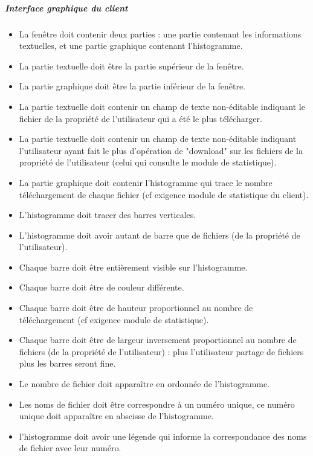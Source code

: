 \documentclass[10pt,a4paper]{report}
\begin{document}
	\subparagraph{Interface graphique du client}
		\begin{itemize}[label = $\triangleright$]

			\item La fenêtre doit contenir deux parties : une partie contenant les informations textuelles, et une partie graphique contenant l'histogramme.

			\item La partie textuelle doit être la partie supérieur de la fenêtre.

			\item La partie graphique doit être la partie inférieur de la fenêtre.

			\item La partie textuelle doit contenir un champ de texte non-éditable indiquant le fichier de la propriété de l'utilisateur qui a été le plus télécharger.

			\item La partie textuelle doit contenir un champ de texte non-éditable indiquant l'utilisateur ayant fait le plus d'opération de "download" sur les fichiers de la propriété de l'utilisateur (celui qui consulte le module de statistique).

			\item La partie graphique doit contenir l'histogramme qui trace le nombre téléchargement de chaque fichier (cf exigence module de statistique du client).

			\item L'histogramme doit tracer des barres verticales.

			\item L'histogramme doit avoir autant de barre que de fichiers (de la propriété de l'utilisateur).

			\item Chaque barre doit être entièrement visible sur l'histogramme.

			\item Chaque barre doit être de couleur différente.

			\item Chaque barre doit être de hauteur proportionnel au nombre de téléchargement (cf exigence module de statistique).

			\item Chaque barre doit être de largeur inversement proportionnel au nombre de fichiers (de la propriété de l'utilisateur) : plus l'utilisateur partage de fichiers plus les barres seront fine.

			\item Le nombre de fichier doit apparaître en ordonnée de l'histogramme.

			\item Les noms de fichier doit être correspondre à un numéro unique, ce numéro unique doit apparaître en abscisse de l'histogramme.

			\item l'histogramme doit avoir une légende qui informe la correspondance des noms de fichier avec leur numéro.
		\end{itemize}
\end{document}
